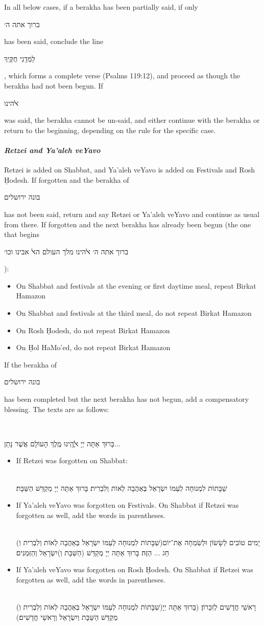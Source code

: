 \documentclass[11pt]{article}
\newcommand{\hebword}[1]{‎\begin{hebrew}\beginR #1 \endR\end{hebrew}}
\begin{document}
In all below cases, if a berakha has been partially said, if only \hebword{ברוך אתה ה׳} has been said, conclude the line \hebword{לַמְּדֵֽנִי חֻקֶּֽיךָ}, which forms a complete verse (Psalms 119:12), and proceed as though the berakha had not been begun.  If \hebword{ﭏהינו} was said, the berakha cannot be un-said, and either continue with the berakha or return to the beginning, depending on the rule for the specific case.

\paragraph{\textit{Retzei and Ya'aleh veYavo}} Retzei is added on Shabbat, and Ya'aleh veYavo is added on Festivals and Rosh \d{H}odesh.  If forgotten and the berakha of \hebword{בונה ירושלים} has not been said, return and say Retzei or Ya'aleh veYavo and continue as usual from there.  If forgotten and the next berakha has already been begun (the one that begins \hebword{ברוך אתה ה׳ ﭏהינו מלך העולם הﭏ אבינו וכו׳}): \begin{itemize}
	\item On Shabbat and festivals at the evening or first daytime meal, repeat Birkat Hamazon
	\item On Shabbat and festivals at the third meal, do not repeat Birkat Hamazon
	\item On Rosh \d{H}odesh, do not repeat Birkat Hamazon
	\item On \d{H}ol HaMo'ed, do not repeat Birkat Hamazon
\end{itemize}

If the berakha of \hebword{בונה ירושלים} has been completed but the next berakha has not begun, add a compensatory blessing.  The texts are as follows:

\hebword{בָּרוּךְ אַתָּה יְיָ ﭏֱֹהֵֽינוּ מֶֽלֶךְ הָעוֹלָם אֲשֶׁר נָתַן...}

\begin{itemize}
	\item If Retzei was forgotten on Shabbat:\\\hebword{שַׁבָּתוֹת לִמְנוּחָה לְעַמּוֹ יִשְׂרָאֵל בְּאַהֲבָה לְאוֹת וְלִבְרִית׃ בָּרוּךְ אַתָּה יְיָ מְקַדֵּשׁ הַשַּׁבָּת׃}
	\item If Ya'aleh veYavo was forgotten on Festivals. On Shabbat if Retzei was forgotten as well, add the words in parentheses.\\\hebword{
		(שַׁבָּתוֹת לִמְנוּחָה לְעַמּוֹ יִשְׂרָאֵל בְּאַהֲבָה לְאוֹת וְלִבְרִית וֽ)יָמִים טוֹבִים לְשָׂשׂוֹן וּלְשִׂמְחָה אֶת־יוֹם חַג ... הַזֶּה׃ בָּרוּךְ אַתָּה יְיָ מְקַדֵּשׁ (הַשַּׁבָּת וְ)יִשְׂרָאֵל וְהַזְּמַנִּים׃}
	\item If Ya'aleh veYavo was forgotten on Rosh \d{H}odesh.  On Shabbat if Retzei was forgotten as well, add the words in parentheses. \\\hebword{
		(שַׁבָּתוֹת לִמְנוּחָה לְעַמּוֹ יִשְׂרָאֵל בְּאַהֲבָה לְאוֹת וְלִבְרִית וֽ)רָאשֵׁי חֳדָשִׁים לְזִכָּרוֹן׃ (בָּרוּךְ אַתָּה יְיָ מְקַדֵּשׁ הַשַּׁבָּת וְיִשְׂרָאֵל וְרָאשֵׁי חֳדָשִׁים׃)}
\end{itemize}
\end{document}
